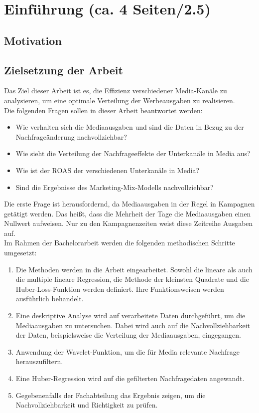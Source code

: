 
\newpage
\section{Einführung (ca. 4 Seiten/2.5)}
\label{Einführung}
\subsection{Motivation}
\iffalse
Erkläre, warum das Thema Media \ac{ROAS} im Kontext von bonprix relevant ist.
Diskutiere die Bedeutung von Marketing-Analysen in der heutigen digitalen Welt und wie sie Unternehmen helfen, ihre Strategien zu optimieren.
Füge aktuelle Statistiken oder Beispiele aus der Branche hinzu, um deine Argumente zu untermauern.
\fi
\subsection{Zielsetzung der Arbeit}
\label{ZielsetzungDerArbeit}
Das Ziel dieser Arbeit ist es, die Effizienz verschiedener Media-Kanäle zu analysieren, um eine optimale Verteilung der Werbeausgaben zu realisieren. \\
Die folgenden Fragen sollen in dieser Arbeit beantwortet werden:
\begin{itemize}
    \item Wie verhalten sich die Mediaausgaben und sind die Daten in Bezug zu der Nachfrageänderung nachvollziehbar? 
    \item Wie sieht die Verteilung der Nachfrageeffekte der Unterkanäle in Media aus?
    \item  Wie ist der ROAS der verschiedenen Unterkanäle in Media?
    \item Sind die Ergebnisse des Marketing-Mix-Modells nachvollziehbar? 
\end{itemize} 
Die erste Frage ist herausfordernd, da Mediaausgaben in der Regel in Kampagnen getätigt werden. Das heißt, dass die Mehrheit der Tage die Mediaausgaben einen Nullwert aufweisen. Nur zu den Kampagnenzeiten weist diese Zeitreihe Ausgaben auf.\\
Im Rahmen der Bachelorarbeit werden die folgenden methodischen Schritte umgesetzt:
\begin{enumerate}
    \item Die Methoden werden in die Arbeit eingearbeitet. Sowohl die lineare als auch die multiple lineare Regression, die Methode der kleinsten Quadrate und die Huber-Loss-Funktion werden definiert. Ihre Funktionsweisen werden ausführlich behandelt.
    \item Eine deskriptive Analyse wird auf verarbeitete Daten durchgeführt, um die Mediaausgaben zu untersuchen. Dabei wird auch auf die Nachvollziehbarkeit der Daten, beispielsweise die Verteilung der Mediaausgaben, eingegangen.
    \item Anwendung der Wavelet-Funktion, um die für Media relevante Nachfrage herauszufiltern.
    \item Eine Huber-Regression wird auf die gefilterten Nachfragedaten angewandt.
    \item Gegebenenfalls der Fachabteilung das Ergebnis zeigen, um die Nachvollziehbarkeit und Richtigkeit zu prüfen.
\end{enumerate}
